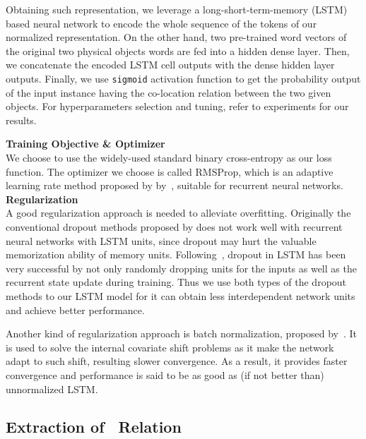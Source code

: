 Obtaining such representation, we leverage a long-short-term-memory (LSTM) based neural network to encode the whole sequence of the tokens of our normalized representation. On the other hand, two pre-trained word vectors of the original two physical objects words are fed into a hidden dense layer. 
Then, we concatenate the encoded LSTM cell outputs with the dense hidden layer outputs.
Finally, we use \texttt{sigmoid} activation function to get the 
probability output of the input instance having the co-location relation 
between the two given objects. For hyperparameters selection and tuning, refer to experiments for our results.

\noindent \textbf{Training Objective \& Optimizer}\\
We choose to use the widely-used standard binary cross-entropy as our loss function.
The optimizer we choose is called RMSProp, which is an adaptive learning rate method proposed by by~\citeauthor{hinton2012neural}, suitable for recurrent neural networks.\\
\noindent
\textbf{Regularization}\\
A good regularization approach is needed to alleviate overfitting. Originally the conventional dropout methods proposed by \citeauthor{hinton2012improving} does not work well with recurrent neural networks with LSTM units, since dropout may hurt the valuable memorization ability of memory units. Following~\citeauthor{zaremba2014recurrent}, dropout in LSTM has been very successful by not only randomly dropping units for the inputs as well as the recurrent state update during training. Thus we use both types of the dropout methods to our LSTM model for it can obtain less interdependent network units and achieve better performance.

Another kind of regularization approach is batch normalization, proposed by~\citeauthor{ioffe2015batch,cooijmans2016recurrent}. It is used to solve the internal covariate shift problems as it make the network adapt to such shift, resulting slower convergence. As a result, it provides faster convergence and performance is said to be as good as (if not better than) unnormalized LSTM. 

\subsection{Extraction of \lnear\ Relation}
\label{sec:mine}
%
%


